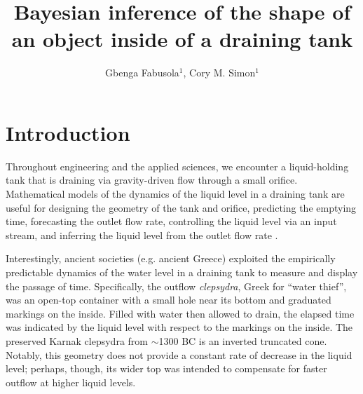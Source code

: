 \documentclass[openacc]{rsproca_new}%
\begin{document}
\title{Bayesian inference of the shape of an object inside of a draining tank}

\author{%
Gbenga Fabusola$^{1}$, 
Cory M. Simon$^{1}$
}

\address{$^{1}$School of Chemical, Biological, and Environmental Engineering. Oregon State University. Corvallis, OR, USA.
}

\subject{applied mathematics, chemical engineering}



\begin{abstract}

\absbreak %
\end{abstract}

\rsbreak


\section{Introduction}
Throughout engineering and the applied sciences, we encounter a liquid-holding tank that is draining via gravity-driven flow through a small orifice.
Mathematical models of the dynamics of the liquid level in a draining tank are useful for designing the geometry of the tank and orifice, predicting the emptying time, forecasting the outlet flow rate, controlling the liquid level via an input stream, and inferring the liquid level from the outlet flow rate \cite{d2021torricelli,seborg2016process,groetsch1993inverse,groetsch1999inverse}.

Interestingly, ancient societies (e.g. ancient Greece) exploited the empirically predictable dynamics of the water level in a draining tank to measure and display the passage of time.
Specifically, the outflow \emph{clepsydra}, Greek for ``water thief'', was an open-top container with a small hole near its bottom and graduated markings on the inside. 
Filled with water then allowed to drain, the elapsed time was indicated by the liquid level with respect to the markings on the inside. \cite{bedini1962compartmented,hwang2021historical,ritner2016oriental,hejun1987research,schomberg2018karnak,mills1982newton}
The preserved Karnak clepsydra from $\sim$1300 BC \cite{schomberg2018karnak} is an inverted truncated cone. Notably, this geometry does not provide a constant rate of decrease in the liquid level; perhaps, though, its wider top was intended to compensate for faster outflow at higher liquid levels.
\end{document}
